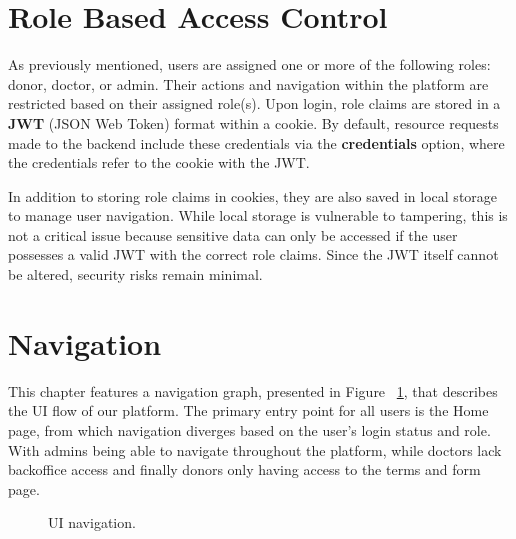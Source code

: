 \newpage


\section{Role Based Access Control}
As previously mentioned, users are assigned one or more of the following roles: donor, doctor, or admin. Their actions and navigation within the platform are restricted based on their assigned role(s). Upon login, role claims are stored in a \textbf{JWT} (JSON Web Token) format within a cookie. By default, resource requests made to the backend include these credentials via the \textbf{credentials} option, where the credentials refer to the cookie with the JWT.

In addition to storing role claims in cookies, they are also saved in local storage to manage user navigation. While local storage is vulnerable to tampering, this is not a critical issue because sensitive data can only be accessed if the user possesses a valid JWT with the correct role claims. Since the JWT itself cannot be altered, security risks remain minimal.
\section{Navigation}

This chapter features a navigation graph, presented in Figure ~\ref{fig:userNavigation}, that describes the UI flow of our platform.
The primary entry point for all users is the Home page, from which navigation diverges based on the user's login status and role.
With admins being able to navigate throughout the platform, while doctors lack backoffice access and finally donors only having access to the terms and form page.

\begin{figure}[H]
	\begin{center}
	\end{center}
	\caption{UI navigation.}\label{fig:userNavigation}
\end{figure}



